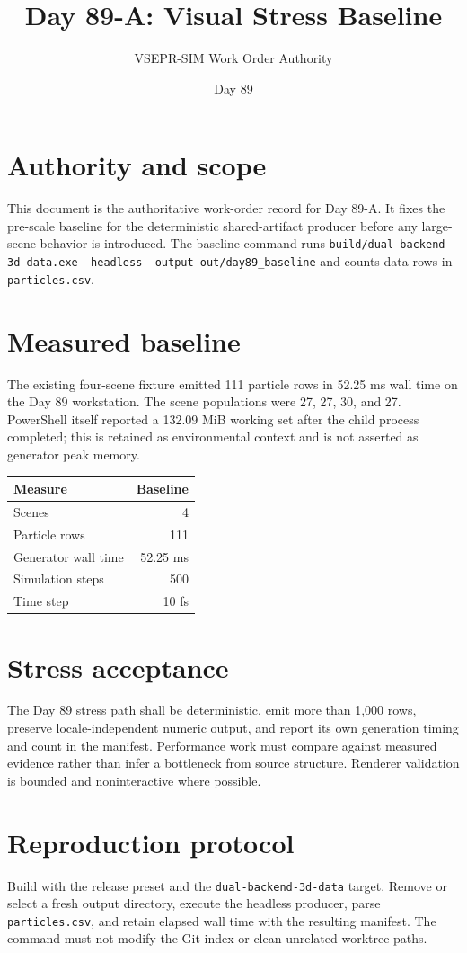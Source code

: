 \documentclass[11pt]{article}
\title{Day 89-A: Visual Stress Baseline}
\author{VSEPR-SIM Work Order Authority}
\date{Day 89}
\begin{document}
\maketitle
\section{Authority and scope}
This document is the authoritative work-order record for Day 89-A. It fixes the pre-scale baseline for the deterministic shared-artifact producer before any large-scene behavior is introduced. The baseline command runs \texttt{build/dual-backend-3d-data.exe --headless --output out/day89\_baseline} and counts data rows in \texttt{particles.csv}.

\section{Measured baseline}
The existing four-scene fixture emitted 111 particle rows in 52.25 ms wall time on the Day 89 workstation. The scene populations were 27, 27, 30, and 27. PowerShell itself reported a 132.09 MiB working set after the child process completed; this is retained as environmental context and is not asserted as generator peak memory.

\begin{center}
\begin{tabular}{lr}
\toprule
Measure & Baseline \\
\midrule
Scenes & 4 \\
Particle rows & 111 \\
Generator wall time & 52.25 ms \\
Simulation steps & 500 \\
Time step & 10 fs \\
\bottomrule
\end{tabular}
\end{center}

\section{Stress acceptance}
The Day 89 stress path shall be deterministic, emit more than 1,000 rows, preserve locale-independent numeric output, and report its own generation timing and count in the manifest. Performance work must compare against measured evidence rather than infer a bottleneck from source structure. Renderer validation is bounded and noninteractive where possible.

\newpage
\section{Reproduction protocol}
Build with the release preset and the \texttt{dual-backend-3d-data} target. Remove or select a fresh output directory, execute the headless producer, parse \texttt{particles.csv}, and retain elapsed wall time with the resulting manifest. The command must not modify the Git index or clean unrelated worktree paths.
\end{document}
